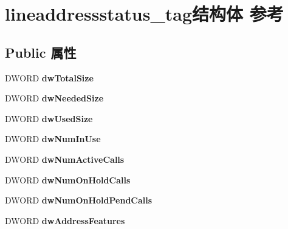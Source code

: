 \hypertarget{structlineaddressstatus__tag}{}\section{lineaddressstatus\+\_\+tag结构体 参考}
\label{structlineaddressstatus__tag}
\subsection*{Public 属性}
\begin{DoxyCompactItemize}
\item 
\mbox{\label{structlineaddressstatus__tag_a6b4d2bfc4d539a3498e60940e85d08c4}} 
D\+W\+O\+RD {\bfseries dw\+Total\+Size}
\item 
\mbox{\label{structlineaddressstatus__tag_ac838802b94d3bbf3a57f36797add1db6}} 
D\+W\+O\+RD {\bfseries dw\+Needed\+Size}
\item 
\mbox{\label{structlineaddressstatus__tag_ae9a3cd1dea0935c022b6ae71bad7dddd}} 
D\+W\+O\+RD {\bfseries dw\+Used\+Size}
\item 
\mbox{\label{structlineaddressstatus__tag_a15270458218ffaee19663755dea3bdf4}} 
D\+W\+O\+RD {\bfseries dw\+Num\+In\+Use}
\item 
\mbox{\label{structlineaddressstatus__tag_ac9321b32c5b12e88f0ec0d1dcfc963ec}} 
D\+W\+O\+RD {\bfseries dw\+Num\+Active\+Calls}
\item 
\mbox{\label{structlineaddressstatus__tag_aeae47053c4712df0e7732905375d2dfb}} 
D\+W\+O\+RD {\bfseries dw\+Num\+On\+Hold\+Calls}
\item 
\mbox{\label{structlineaddressstatus__tag_ac5f2b3295bb06c585a1634b70c3b7206}} 
D\+W\+O\+RD {\bfseries dw\+Num\+On\+Hold\+Pend\+Calls}
\item 
\mbox{\label{structlineaddressstatus__tag_acac1b0f7f6207b1399e9e6ae0f65e6f7}} 
D\+W\+O\+RD {\bfseries dw\+Address\+Features}
\item 

\end{DoxyCompactItemize}
